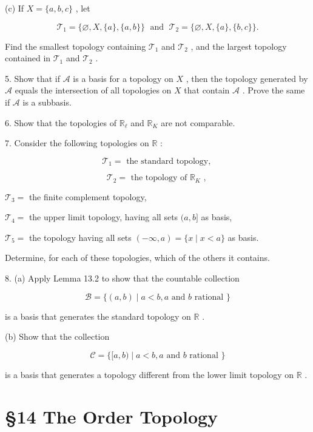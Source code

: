 \documentclass[10pt]{article}
\begin{document}
(c) If \(X = \{ a,b,c\}\) , let

\[
{\mathcal{T}}_{1} = \{ \varnothing ,X,\{ a\} ,\{ a,b\} \} \;\text{ and }\;{\mathcal{T}}_{2} = \{ \varnothing ,X,\{ a\} ,\{ b,c\} \} .
\]

Find the smallest topology containing \({\mathcal{T}}_{1}\) and \({\mathcal{T}}_{2}\) , and the largest topology contained in \({\mathcal{T}}_{1}\) and \({\mathcal{T}}_{2}\) .

5. Show that if \(\mathcal{A}\) is a basis for a topology on \(X\) , then the topology generated by \(\mathcal{A}\) equals the intersection of all topologies on \(X\) that contain \(\mathcal{A}\) . Prove the same if \(\mathcal{A}\) is a subbasis.

6. Show that the topologies of \({\mathbb{R}}_{\ell }\) and \({\mathbb{R}}_{K}\) are not comparable.

7. Consider the following topologies on \(\mathbb{R}\) :

\[
{\mathcal{T}}_{1} = \text{ the standard topology, }
\]

\[
{\mathcal{T}}_{2} = \text{ the topology of }{\mathbb{R}}_{K}\text{ , }
\]

\({\mathcal{T}}_{3} =\) the finite complement topology,

\({\mathcal{T}}_{4} =\) the upper limit topology, having all sets \((a,b\rbrack\) as basis,

\({\mathcal{T}}_{5} =\) the topology having all sets \(\left( {-\infty ,a}\right)  = \{ x \mid  x < a\}\) as basis.

Determine, for each of these topologies, which of the others it contains.

8. (a) Apply Lemma 13.2 to show that the countable collection

\[
\mathcal{B} = \{ \left( {a,b}\right)  \mid  a < b,a\text{ and }b\text{ rational }\}
\]

is a basis that generates the standard topology on \(\mathbb{R}\) .

(b) Show that the collection

\[
\mathcal{C} = \{ \lbrack a,b) \mid  a < b,a\text{ and }b\text{ rational }\}
\]

is a basis that generates a topology different from the lower limit topology on \(\mathbb{R}\) .

\section*{§14 The Order Topology}
\end{document}
